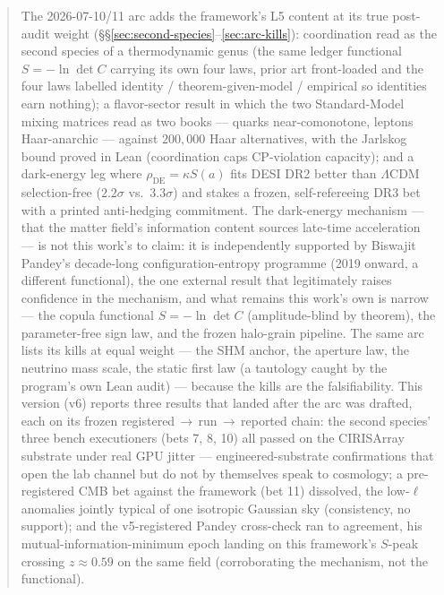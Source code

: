 \documentclass[11pt,a4paper]{article}
\begin{document}
\begin{abstract}
The 2026-07-10/11 arc adds the framework's L5 content at its true post-audit weight (\S\S\ref{sec:second-species}--\ref{sec:arc-kills}): coordination read as the second species of a thermodynamic genus (the same ledger functional $S = -\ln\det C$ carrying its own four laws, prior art front-loaded and the four laws labelled identity / theorem-given-model / empirical so identities earn nothing); a flavor-sector result in which the two Standard-Model mixing matrices read as two books --- quarks near-comonotone, leptons Haar-anarchic --- against $200{,}000$ Haar alternatives, with the Jarlskog bound proved in Lean (coordination caps CP-violation capacity); and a dark-energy leg where $\rho_{\text{DE}} = \kappa S(a)$ fits DESI DR2 better than $\Lambda$CDM selection-free ($2.2\sigma$ vs.\ $3.3\sigma$) and stakes a frozen, self-refereeing DR3 bet with a printed anti-hedging commitment. The dark-energy mechanism --- that the matter field's information content sources late-time acceleration --- is not this work's to claim: it is independently supported by Biswajit Pandey's decade-long configuration-entropy programme (2019 onward, a different functional), the one external result that legitimately raises confidence in the mechanism, and what remains this work's own is narrow --- the copula functional $S = -\ln\det C$ (amplitude-blind by theorem), the parameter-free sign law, and the frozen halo-grain pipeline. The same arc lists its kills at equal weight --- the SHM anchor, the aperture law, the neutrino mass scale, the static first law (a tautology caught by the program's own Lean audit) --- because the kills are the falsifiability. This version (v6) reports three results that landed after the arc was drafted, each on its frozen registered$\,\to\,$run$\,\to\,$reported chain: the second species' three bench executioners (bets 7, 8, 10) all passed on the CIRISArray substrate under real GPU jitter --- engineered-substrate confirmations that open the lab channel but do not by themselves speak to cosmology; a pre-registered CMB bet against the framework (bet 11) dissolved, the low-$\ell$ anomalies jointly typical of one isotropic Gaussian sky (consistency, no support); and the v5-registered Pandey cross-check ran to agreement, his mutual-information-minimum epoch landing on this framework's $S$-peak crossing $z \approx 0.59$ on the same field (corroborating the mechanism, not the functional).


\end{abstract}
\end{document}
